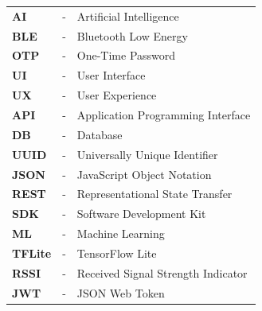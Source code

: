 
\begin{tabular}{lll}
	\textbf{AI} & - & Artificial Intelligence\\
	\textbf{BLE} & - & Bluetooth Low Energy\\
	\textbf{OTP} & - & One-Time Password\\
	\textbf{UI} & - & User Interface\\
	\textbf{UX} & - & User Experience\\
	\textbf{API} & - & Application Programming Interface\\
	\textbf{DB} & - & Database\\
	\textbf{UUID} & - & Universally Unique Identifier\\
	\textbf{JSON} & - & JavaScript Object Notation\\
	\textbf{REST} & - & Representational State Transfer\\
	\textbf{SDK} & - & Software Development Kit\\
	\textbf{ML} & - & Machine Learning\\
	\textbf{TFLite} & - & TensorFlow Lite\\
	\textbf{RSSI} & - & Received Signal Strength Indicator\\
	\textbf{JWT} & - & JSON Web Token\\
\end{tabular}

